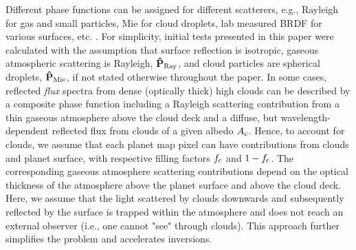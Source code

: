 \documentclass{emulateapj}
\begin{document}
Different phase functions can be assigned for different scatterers, e.g., 
Rayleigh for gas and small particles, Mie for cloud droplets, lab measured BRDF 
for various surfaces, etc. \citep[e.g.,][]{berdetal2016,berd2016}.
For simplicity, initial tests presented in this paper were calculated with the
assumption that surface reflection is isotropic, gaseous atmospheric 
scattering is Rayleigh, $\bf{\hat{P}}_{\rm Ray}$, and cloud particles are spherical droplets,
$\bf{\hat{P}}_{\rm Mie}$, if not stated otherwise throughout the paper. 
In some cases, reflected {\em flux} spectra from dense (optically thick) 
high clouds can be described by a composite phase function including 
a Rayleigh scattering contribution from a thin gaseous atmosphere above the cloud deck 
and a diffuse, but wavelength-dependent reflected flux from clouds of a given albedo $A_{\rm c}$. 
Hence, to account for clouds, we assume that each planet map pixel can have contributions 
from clouds and planet surface, with respective filling factors
$f_{\rm c}$ and $1-f_{\rm c}$. The corresponding gaseous atmosphere scattering contributions 
depend on the optical thickness of the atmosphere above the planet surface and above the cloud deck.
Here, we assume that the light scattered by clouds downwards and subsequently reflected 
by the surface is trapped within the atmosphere and does not reach an external observer
(i.e., one cannot "see" through clouds). This approach further simplifies the problem 
and accelerates inversions.
\end{document}
